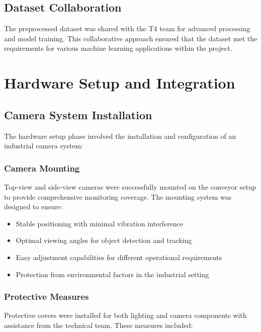 \documentclass{book}
\begin{document}
\subsection{Dataset Collaboration}
\par\noindent The preprocessed dataset was shared with the T4 team for advanced processing and model training. This collaborative approach ensured that the dataset met the requirements for various machine learning applications within the project.

\section{Hardware Setup and Integration}

\subsection{Camera System Installation}
\par\noindent The hardware setup phase involved the installation and configuration of an industrial camera system:

\subsubsection{Camera Mounting}
\par\noindent Top-view and side-view cameras were successfully mounted on the conveyor setup to provide comprehensive monitoring coverage. The mounting system was designed to ensure:

\begin{itemize}
\item Stable positioning with minimal vibration interference
\item Optimal viewing angles for object detection and tracking
\item Easy adjustment capabilities for different operational requirements
\item Protection from environmental factors in the industrial setting
\end{itemize}

\subsubsection{Protective Measures}
\par\noindent Protective covers were installed for both lighting and camera components with assistance from the technical team. These measures included:
\end{document}
